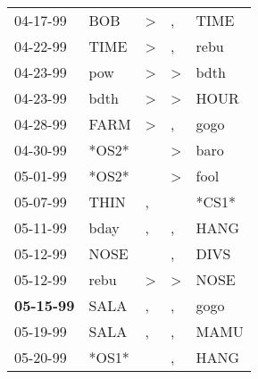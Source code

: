 \begin{supertabular}{p{0.07\textwidth}p{0.06\textwidth}p{0.02\textwidth}p{0.02\textwidth}p{0.06\textwidth}}
          04-17-99\textsuperscript{} &            BOB\textsuperscript{} &     \textgreater &                , &           TIME\textsuperscript{} \\
          04-22-99\textsuperscript{} &           TIME\textsuperscript{} &     \textgreater &                , &           rebu\textsuperscript{} \\
          04-23-99\textsuperscript{} &            pow\textsuperscript{} &     \textgreater &     \textgreater &           bdth\textsuperscript{} \\
          04-23-99\textsuperscript{} &           bdth\textsuperscript{} &     \textgreater &     \textgreater &           HOUR\textsuperscript{} \\
          04-28-99\textsuperscript{} &           FARM\textsuperscript{} &     \textgreater &                , &           gogo\textsuperscript{} \\
          04-30-99\textsuperscript{} &                            *OS2* &                  &     \textgreater &           baro\textsuperscript{} \\
          05-01-99\textsuperscript{} &                            *OS2* &                  &     \textgreater &           fool\textsuperscript{} \\
          05-07-99\textsuperscript{} &           THIN\textsuperscript{} &                , &                  &                            *CS1* \\
          05-11-99\textsuperscript{} &           bday\textsuperscript{} &                , &                , &           HANG\textsuperscript{} \\
          05-12-99\textsuperscript{} &           NOSE\textsuperscript{} &                  &                , &           DIVS\textsuperscript{} \\
          05-12-99\textsuperscript{} &           rebu\textsuperscript{} &     \textgreater &     \textgreater &           NOSE\textsuperscript{} \\
 \textbf{05-15-99\textsuperscript{}} &           SALA\textsuperscript{} &                , &                , &           gogo\textsuperscript{} \\
          05-19-99\textsuperscript{} &           SALA\textsuperscript{} &                , &                , &           MAMU\textsuperscript{} \\
          05-20-99\textsuperscript{} &                            *OS1* &                  &                , &           HANG\textsuperscript{} \\

\end{supertabular}
